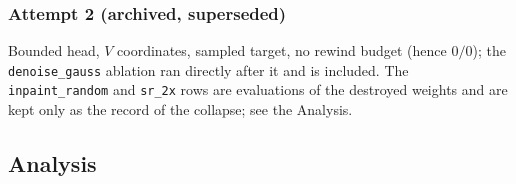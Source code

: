 \documentclass[11pt]{article}
\begin{document}
\subsubsection*{Attempt 2 (archived, superseded)}
Bounded head, $V$ coordinates, sampled target, no rewind budget (hence
$0/0$); the \texttt{denoise\_gauss} ablation ran directly after it and is
included. The \texttt{inpaint\_random} and \texttt{sr\_2x} rows are
evaluations of the destroyed weights and are kept only as the record of the
collapse; see the Analysis.
\begin{center}
\end{center}
\clearpage

\subsection{Analysis}
\label{sec:step7analysis}
\end{document}
